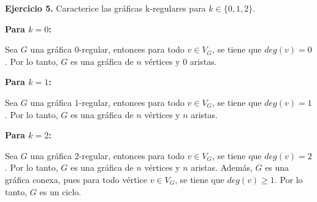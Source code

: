 \textbf{Ejercicio 5.} Caracterice las gráficas k-regulares para $k\in\{0,1,2\}$.

\textbf{Para $k = 0$:}

Sea $G$ una gráfica $0$-regular, entonces para todo $v\in V_G$, se tiene que
$deg(v)=0$. Por lo tanto, $G$ es una gráfica de $n$ vértices y $0$ aristas.

\textbf{Para $k = 1$:}

Sea $G$ una gráfica $1$-regular, entonces para todo $v\in V_G$, se tiene que 
$deg(v)=1$. Por lo tanto, $G$ es una gráfica de $n$ vértices y $n$ aristas.


\textbf{Para $k = 2$:}

Sea $G$ una gráfica $2$-regular, entonces para todo $v\in V_G$, se tiene que 
$deg(v)=2$. Por lo tanto, $G$ es una gráfica de $n$ vértices y $n$ aristas. Además, 
$G$ es una gráfica conexa, pues para todo vértice $v\in V_G$, se tiene que $deg(v)\geq 1$. 
Por lo tanto, $G$ es un ciclo.